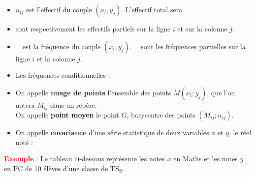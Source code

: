 \documentclass[12pt,a4paper]{article}
\begin{document}
\begin{itemize}
    \item \( n_{ij} \) est l’effectif du couple \( (x_i, y_j) \). L’effectif total sera 
    \item 
    sont respectivement les effectifs partiels sur la ligne \( i \) et sur la colonne \( j \).
    
    \item 
    $\quad \text{est la fréquence du couple } (x_i, y_j). \quad $
    sont les fréquences partielles sur la ligne $i$ et la colonne $j$.

    \item Les fréquences conditionnelles : 

    \item On appelle \textbf{nuage de points} l’ensemble des points \( M(x_i ; y_j) \), que l’on notera \( M_{ij} \) dans un repère.\\
    On appelle \textbf{point moyen} le point \( G \), barycentre des points \( (M_{ij} ; n_{ij}) \).

    \item On appelle \textbf{covariance} d’une série statistique de deux variables \( x \) et \( y \), le réel noté :


\end{itemize}
\noindent
\textbf{\textcolor{red}{\underline{Exemple}}} : Le tableau ci-dessous représente les notes \( x \) en Maths et les notes \( y \) en PC de 10 élèves d’une classe de TS\textsubscript{2}.

\vspace{0.5cm}
\end{document}
